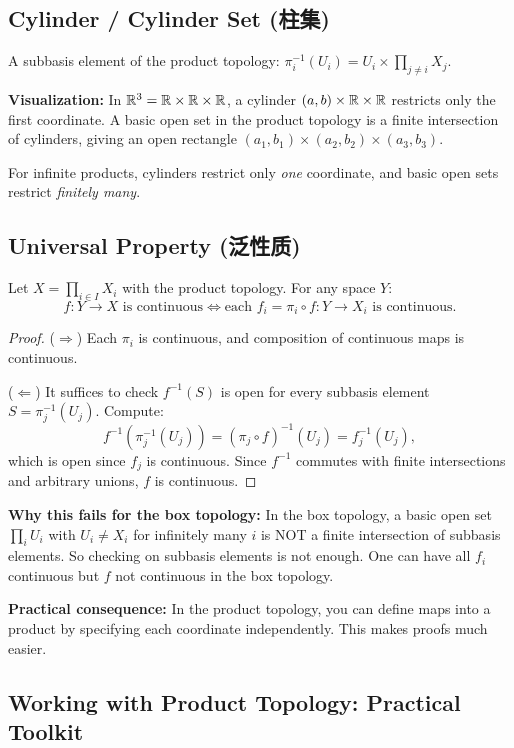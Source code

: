 \documentclass{article}
\begin{document}
\subsection{Cylinder / Cylinder Set (柱集)}\label{def:cylinder}
A subbasis element of the product topology: $\pi_i^{-1}(U_i) = U_i
\times \prod_{j \ne i} X_j$.

\textbf{Visualization:} In $\mathbb{R}^3 = \mathbb{R} \times \mathbb{R} \times \mathbb{R}$, a cylinder
$(a,b) \times \mathbb{R} \times \mathbb{R}$ restricts only the first coordinate. A
basic open set in the product topology is a finite intersection of
cylinders, giving an open rectangle $(a_1,b_1) \times (a_2,b_2) \times
(a_3,b_3)$.

For infinite products, cylinders restrict only \emph{one} coordinate,
and basic open sets restrict \emph{finitely many}.

\subsection{Universal Property (泛性质)}\label{def:universal}
\begin{theorem}
  Let $X = \prod_{i \in I} X_i$ with the product topology. For any
  space $Y$:
  \[
    f : Y \to X \text{ is continuous} \iff \text{each } f_i = \pi_i
    \circ f : Y \to X_i \text{ is continuous.}
  \]
\end{theorem}
\begin{proof}
  ($\Rightarrow$) Each $\pi_i$ is continuous, and composition of
  continuous maps is continuous.

  ($\Leftarrow$) It suffices to check $f^{-1}(S)$ is open for every
  subbasis element $S = \pi_j^{-1}(U_j)$. Compute:
  \[
    f^{-1}(\pi_j^{-1}(U_j)) = (\pi_j \circ f)^{-1}(U_j) =
    f_j^{-1}(U_j),
  \]
  which is open since $f_j$ is continuous. Since $f^{-1}$ commutes with
  finite intersections and arbitrary unions, $f$ is continuous.
\end{proof}

\textbf{Why this fails for the box topology:} In the box topology, a
basic open set $\prod_i U_i$ with $U_i \ne X_i$ for infinitely many $i$
is NOT a finite intersection of subbasis elements. So checking on
subbasis elements is not enough. One can have all $f_i$ continuous but
$f$ not continuous in the box topology.

\textbf{Practical consequence:} In the product topology, you can define
maps into a product by specifying each coordinate independently. This
makes proofs much easier.

\subsection{Working with Product Topology: Practical Toolkit}
\end{document}
